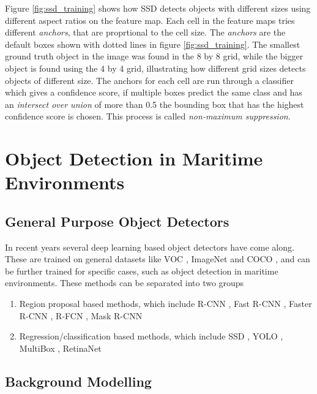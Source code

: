 Figure \ref{fig:ssd_training} shows how SSD detects objects with different sizes using different aspect ratios on the feature map. Each cell in the feature maps tries different \textit{anchors}, that are proprtional to the cell size. The \textit{anchors} are the default boxes shown with dotted lines in figure \ref{fig:ssd_training}. The smallest ground truth object in the image was found in the 8 by 8 grid, while the bigger object is found using the 4 by 4 grid, illustrating how different grid sizes detects objects of different size. The anchors for each cell are run through a classifier which gives a confidence score, if multiple boxes predict the same class and has an \textit{intersect over union} of more than 0.5 the bounding box that has the highest confidence score is chosen. This process is called \textit{non-maximum suppression}.


\section{Object Detection in Maritime Environments}
\label{sec:obj_det}


\subsection{General Purpose Object Detectors}
In recent years several deep learning based object detectors have come along. These are trained on general datasets like VOC \citep{Everingham2012}\citep{Everingham2007}, ImageNet \citep{Imagenet} and COCO \citep{COCO},  and can be further trained for specific cases, such as object detection in maritime environments. These methods can be separated into two groups 

\begin{enumerate}
\item Region proposal based methods, which include R-CNN \citep{R-CNN}, Fast R-CNN \citep{FastR-CNN}, Faster R-CNN \citep{FasterR-CNN}, R-FCN \citep{R-FCN}, Mask R-CNN \citep{MaskRCNN}
\item Regression/classification based methods, which include SSD \citep{SSD}, YOLO \citep{YOLOv1} \citep{YOLOv2} \citep{YOLOv3}, MultiBox \citep{Multibox}, RetinaNet \citep{Retinanet}
\end{enumerate}




\subsection{Background Modelling}

